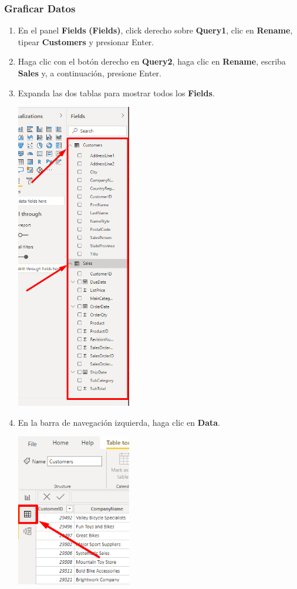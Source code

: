 \documentclass[12pt,letterpaper]{article}
\newcommand\tab[1][1cm]{\hspace*{#1}}
\begin{document}
    \subsubsection{Graficar Datos}
    \begin{enumerate}[\tab 1.]
        \item En el panel \textbf{Fields} \textbf{(Fields)}, click derecho sobre \textbf{Query1}, clic en \textbf{Rename}, tipear \textbf{Customers} y presionar Enter.
        \item Haga clic con el botón derecho en \textbf{Query2}, haga clic en \textbf{Rename}, escriba \textbf{Sales} y, a continuación, presione Enter.
        \item Expanda las dos tablas para mostrar todos los \textbf{Fields}.
        \begin{center}
            \includegraphics[width=5cm]{./img/img16.png}
        \end{center}
        \item En la barra de navegación izquierda, haga clic en \textbf{Data}.
        \begin{center}
            \includegraphics[width=5cm]{./img/img17.png}

\end{center}
\end{enumerate}
\end{document}
